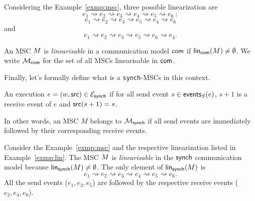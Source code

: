 

\bigskip

\begin{example}\label{exmp:lin}
Considering the Example~\ref{exmp:msc}, three possible linearization
are 
$$e_1 \rightsquigarrow e_2 \rightsquigarrow e_3 \rightsquigarrow e_4
\rightsquigarrow e_5 \rightsquigarrow e_6\ ;$$
$$e_1 \rightsquigarrow e_2 \rightsquigarrow e_3 \rightsquigarrow e_5
\rightsquigarrow e_4 \rightsquigarrow e_6$$ and
$$e_1 \rightsquigarrow e_2 \rightsquigarrow e_3 \rightsquigarrow e_5
\rightsquigarrow e_6 \rightsquigarrow e_4.$$ 
\end{example}

\bigskip
	
\begin{definition}\label{def:linearisable-msc}
	An MSC $M$ is \textit{linearisable} in a communication model $\mathsf{com}$
	if $\mathsf{lin}_{\mathsf{com}}(M)\neq\emptyset$. %
	We write $\mathcal{M}_{\mathsf{com}}$ for the set of all MSCs 
	linearisable in $\mathsf{com}$.
\end{definition}

Finally, let's formally define what is a \verb|synch|-MSCs in this context.

\bigskip

\begin{definition}\label{def:synch}
	An execution $e=(w,\mathsf{src}) \in \mathcal{E}_{\mathsf{synch}}$
	if for all send event $s\in\mathsf{events}_S(e)$, $s+1$ is a receive event
	of $e$ and $\mathsf{src}(s+1)=s$.
\end{definition}


In other words, an MSC $M$ belongs to $\mathcal{M}_{\mathsf{synch}}$ if
all send events are immediately followed by their corresponding receive events.

\bigskip

\begin{example}
Consider the Example~\ref{exmp:msc} and the respective linearization
listed in  Example~\ref{exmp:lin}. 
The MSC $M$ is \textit{linearisable} in the $\mathsf{synch}$ communication 
model because
$\mathsf{lin}_{\mathsf{synch}}(M)\neq\emptyset$.
The only element of $\mathsf{lin}_{\mathsf{synch}}(M)$ is
$$e_1 \rightsquigarrow e_2 \rightsquigarrow e_3 \rightsquigarrow e_4
\rightsquigarrow e_5 \rightsquigarrow e_6.$$
All the send events ($e_1, e_3, e_5$) are followed by the respective
receive events ($e_2, e_4, e_6$).
\end{example}

